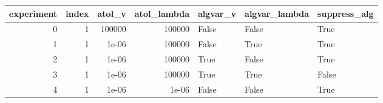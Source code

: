 \begin{tabular}{rrrrlll}
\hline
   experiment &   index &     atol\_v &   atol\_lambda & algvar\_v   & algvar\_lambda   & suppress\_alg   \\
\hline
            0 &       1 & 100000     &    100000     & False      & False           & True           \\
            1 &       1 &      1e-06 &    100000     & False      & True            & True           \\
            2 &       1 &      1e-06 &    100000     & True       & False           & True           \\
            3 &       1 &      1e-06 &    100000     & True       & True            & False          \\
            4 &       1 &      1e-06 &         1e-06 & False      & False           & True           \\
\hline
\end{tabular}